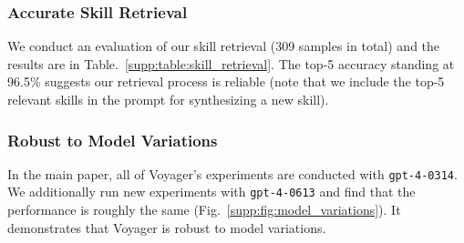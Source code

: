 \subsubsection{Accurate Skill Retrieval}
We conduct an evaluation of our skill retrieval (309 samples in total) and the results are in Table.~\ref{supp:table:skill_retrieval}. The top-5 accuracy standing at 96.5\% suggests our retrieval process is reliable (note that we include the top-5 relevant skills in the prompt for synthesizing a new skill).


\subsubsection{Robust to Model Variations}
In the main paper, all of Voyager's experiments are conducted with \texttt{gpt-4-0314}. We additionally run new experiments with \texttt{gpt-4-0613} and find that the performance is roughly the same (Fig.~\ref{supp:fig:model_variations}). It demonstrates that Voyager is robust to model variations. 

